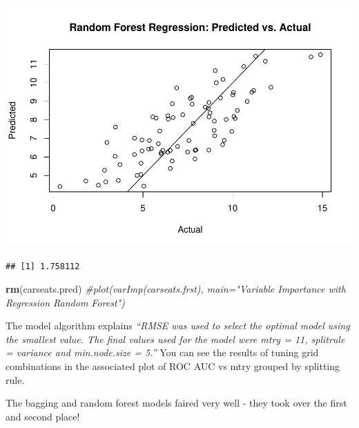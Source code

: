 \documentclass[
]{book}
\newenvironment{Shaded}{\begin{snugshade}}{\end{snugshade}}
\newcommand{\CommentTok}[1]{\textcolor[rgb]{0.56,0.35,0.01}{\textit{#1}}}
\newcommand{\DataTypeTok}[1]{\textcolor[rgb]{0.13,0.29,0.53}{#1}}
\newcommand{\KeywordTok}[1]{\textcolor[rgb]{0.13,0.29,0.53}{\textbf{#1}}}
\newcommand{\NormalTok}[1]{#1}
\newcommand{\OperatorTok}[1]{\textcolor[rgb]{0.81,0.36,0.00}{\textbf{#1}}}
\newcommand{\StringTok}[1]{\textcolor[rgb]{0.31,0.60,0.02}{#1}}
\begin{document}
\includegraphics{data-sci_files/figure-latex/unnamed-chunk-109-2.pdf}

\begin{Shaded}
\end{Shaded}

\begin{verbatim}
## [1] 1.758112
\end{verbatim}

\begin{Shaded}
\begin{Highlighting}[]
\KeywordTok{rm}\NormalTok{(carseats.pred)}
\CommentTok{#plot(varImp(carseats.frst), main="Variable Importance with Regression Random Forest")}
\end{Highlighting}
\end{Shaded}

The model algorithm explains \emph{``RMSE was used to select the optimal model using the smallest value. The final values used for the model were mtry = 11, splitrule = variance and min.node.size = 5.''} You can see the results of tuning grid combinations in the associated plot of ROC AUC vs mtry grouped by splitting rule.

The bagging and random forest models faired very well - they took over the first and second place!
\end{document}
